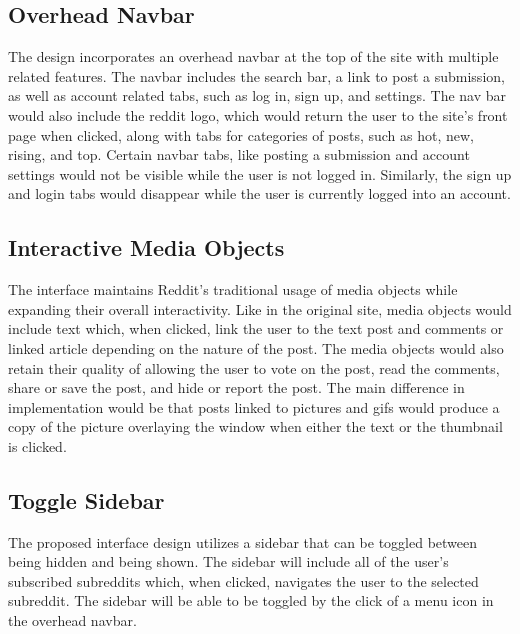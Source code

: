 \documentclass{article}
\begin{document}
\subsection{Overhead Navbar} The design incorporates an overhead navbar at the top of the site with multiple related features. The navbar includes the search bar, a link to post a submission, as well as account related tabs, such as log in, sign up, and settings. The nav bar would also include the reddit logo, which would return the user to the site's front page when clicked, along with tabs for categories of posts, such as hot, new, rising, and top. Certain navbar tabs, like posting a submission and account settings would not be visible while the user is not logged in. Similarly, the sign up and login tabs would disappear while the user is currently logged into an account.

\subsection{Interactive Media Objects} The interface maintains Reddit's traditional usage of media objects while expanding their overall interactivity. Like in the original site, media objects would include text which, when clicked, link the user to the text post and comments or linked article depending on the nature of the post. The media objects would also retain their quality of allowing the user to vote on the post, read the comments, share or save the post, and hide or report the post. The main difference in implementation would be that posts linked to pictures and gifs would produce a copy of the picture overlaying the window when either the text or the thumbnail is clicked.

\subsection{Toggle Sidebar} The proposed interface design utilizes a sidebar that can be toggled between being hidden and being shown. The sidebar will include all of the user's subscribed subreddits which, when clicked, navigates the user to the selected subreddit. The sidebar will be able to be toggled by the click of a menu icon in the overhead navbar. 
\end{document}
